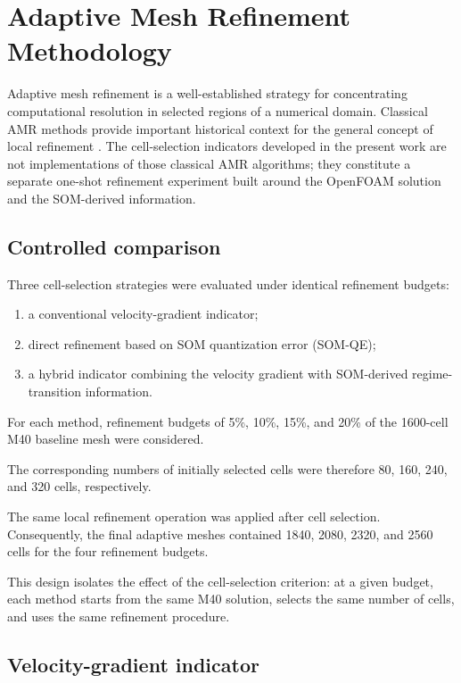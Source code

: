 \section{Adaptive Mesh Refinement Methodology}
\label{sec:adaptive_refinement}

Adaptive mesh refinement is a well-established strategy for concentrating
computational resolution in selected regions of a numerical domain. Classical
AMR methods provide important historical context for the general concept of
local refinement \cite{berger1984,berger1989}. The cell-selection indicators
developed in the present work are not implementations of those classical AMR
algorithms; they constitute a separate one-shot refinement experiment built
around the OpenFOAM solution and the SOM-derived information.

\subsection{Controlled comparison}

Three cell-selection strategies were evaluated under identical refinement
budgets:

\begin{enumerate}
    \item a conventional velocity-gradient indicator;
    \item direct refinement based on SOM quantization error (SOM-QE);
    \item a hybrid indicator combining the velocity gradient with
    SOM-derived regime-transition information.
\end{enumerate}

For each method, refinement budgets of 5\%, 10\%, 15\%, and 20\% of the
1600-cell M40 baseline mesh were considered.

The corresponding numbers of initially selected cells were therefore 80,
160, 240, and 320 cells, respectively.

The same local refinement operation was applied after cell selection.
Consequently, the final adaptive meshes contained 1840, 2080, 2320, and
2560 cells for the four refinement budgets.

This design isolates the effect of the cell-selection criterion: at a given
budget, each method starts from the same M40 solution, selects the same
number of cells, and uses the same refinement procedure.

\subsection{Velocity-gradient indicator}

